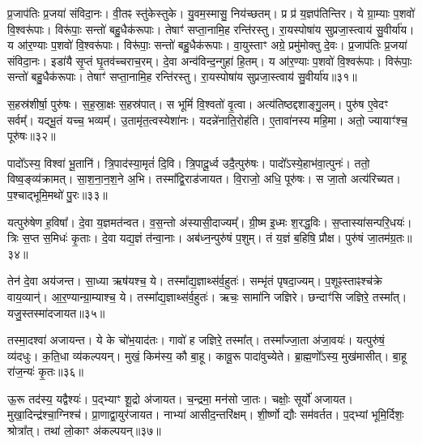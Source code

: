 प्र॒जाप॑तिः प्र॒जया॑ संविदा॒नः। 
वी॒तꣴ स्तु॑केस्तुके। 
यु॒वम॒स्मासु॒ निय॑च्छतम्। 
प्र प्र॑ य॒ज्ञप॑तिन्तिर। 
ये ग्रा॒म्याः प॒शवो॑ वि॒श्वरू॑पाः। 
विरू॑पाः॒ सन्तो॑ बहु॒धैक॑रूपाः। 
तेषाꣳ॑ सप्ता॒नामि॒ह रन्ति॑रस्तु। 
रा॒यस्पोषा॑य सुप्रजा॒स्त्वाय॑ सु॒वीर्या॑य। 
य आ॑र॒ण्याः प॒शवो॑ वि॒श्वरू॑पाः। 
विरू॑पाः॒ सन्तो॑ बहु॒धैक॑रूपाः। 
वा॒युस्ताꣳ अग्रे॒ प्रमु॑मोक्तु दे॒वः। 
प्र॒जाप॑तिः प्र॒जया॑ संविदा॒नः। 
इडा॑यै सृ॒प्तं घृ॒तव॑च्चराच॒रम्। 
दे॒वा अन्व॑विन्द॒न्गुहा॑ हि॒तम्। 
य आ॑र॒ण्याः प॒शवो॑ वि॒श्वरू॑पाः। 
विरू॑पाः॒ सन्तो॑ बहु॒धैक॑रूपाः। 
तेषाꣳ॑ सप्ता॒नामि॒ह रन्ति॑रस्तु। 
रा॒यस्पोषा॑य सुप्रजा॒स्त्वाय॑ सु॒वीर्या॑य॥३१॥
\anuvakamend[आ॒त्मा जना॑नां  विकु॒र्वन्तं॑  विप॒श्चिं प्र॒जानां᳚ वसु॒धानीं᳚  वि॒राजं॒ चर॑न्तं॒  गोम॑तीं मे॒ निय॑च्छ॒त्वेक॑चक्रं॒ व्यो॑मन्मा॒यया॑ दे॒व एक॑रूपा अ॒ष्टौ च॑]

स॒हस्र॑शीर्\mbox{}षा॒ पुरु॑षः। 
स॒ह॒स्रा॒क्षः स॒हस्र॑पात्। 
स भूमिं॑ वि॒श्वतो॑ वृ॒त्वा। 
अत्य॑तिष्ठद्दशाङ्गु॒लम्। 
पुरु॑ष ए॒वेदꣳ सर्वम्᳚। 
यद्भू॒तं यच्च॒ भव्यम्᳚। 
उ॒तामृ॑त॒त्वस्येशा॑नः। 
यदन्ने॑नाति॒रोह॑ति। 
ए॒तावा॑नस्य महि॒मा। 
अतो॒ ज्यायाꣳ॑श्च॒ पूरु॑षः॥३२॥

पादो᳚ऽस्य॒ विश्वा॑ भू॒तानि॑। 
त्रि॒पाद॑स्या॒मृतं॑ दि॒वि। 
त्रि॒पादू॒र्ध्व उदै॒त्पुरु॑षः। 
पादो᳚ऽस्ये॒हाभ॑वा॒त्पुनः॑। 
ततो॒ विष्व॒ङ्व्य॑क्रामत्। 
सा॒श॒ना॒न॒श॒ने अ॒भि। 
तस्मा᳚द्वि॒राड॑जायत। 
वि॒राजो॒ अधि॒ पूरु॑षः। 
स जा॒तो अत्य॑रिच्यत। 
प॒श्चाद्भूमि॒मथो॑ पु॒रः॥३३॥

यत्पुरु॑षेण ह॒विषा᳚। 
दे॒वा य॒ज्ञमत॑न्वत। 
व॒स॒न्तो अ॑स्यासी॒दाज्यम्᳚। 
ग्री॒ष्म इ॒ध्मः  श॒रद्ध॒विः। 
स॒प्तास्या॑सन्परि॒\-धयः॑। 
त्रिः स॒प्त स॒मिधः॑ कृ॒ताः। 
दे॒वा यद्य॒ज्ञं त॑न्वा॒नाः। 
अब॑ध्न॒न्पुरु॑षं प॒शुम्। 
तं य॒ज्ञं ब॒\ar{}हिषि॒ प्रौक्ष\sn{}। 
पुरु॑षं जा॒तम॑ग्र॒तः॥३४॥

तेन॑ दे॒वा अय॑जन्त। 
सा॒ध्या ऋष॑यश्च॒ ये। 
तस्मा᳚द्य॒ज्ञाथ्स॑र्व॒हुतः॑। 
सम्भृ॑तं पृषदा॒ज्यम्। 
प॒शूꣴस्ताꣴश्च॑क्रे वाय॒व्यान्॑। 
आ॒र॒ण्यान्ग्रा॒म्याश्च॒ ये। 
तस्मा᳚द्य॒ज्ञाथ्स॑र्व॒हुतः॑। 
ऋचः॒ सामा॑नि जज्ञिरे। 
छन्दाꣳ॑सि जज्ञिरे॒ तस्मा᳚त्। 
यजु॒स्तस्मा॑दजायत॥३५॥

तस्मा॒दश्वा॑ अजायन्त। 
ये के चो॑भ॒याद॑तः। 
गावो॑ ह जज्ञिरे॒ तस्मा᳚त्। 
तस्मा᳚ज्जा॒ता अ॑जा॒वयः॑। 
यत्पुरु॑षं॒ व्य॑दधुः। 
क॒ति॒धा व्य॑कल्पयन्। 
मुखं॒ किम॑स्य॒ कौ बा॒हू। 
कावू॒रू पादा॑वुच्येते। 
ब्रा॒ह्म॒णो᳚ऽस्य॒ मुख॑मासीत्। 
बा॒हू रा॑ज॒न्यः॑ कृ॒तः॥३६॥

ऊ॒रू तद॑स्य॒ यद्वैश्यः॑। 
प॒द्भ्याꣳ शू॒द्रो अ॑जायत। 
च॒न्द्रमा॒ मन॑सो जा॒तः। 
चक्षोः॒ सूर्यो॑ अजायत। 
मुखा॒दिन्द्र॑श्चा॒ग्निश्च॑। 
प्रा॒णाद्वा॒युर॑जायत। 
नाभ्या॑ आसीद॒न्तरि॑क्षम्। 
शी॒र्ष्णो द्यौः सम॑वर्तत। 
प॒द्भ्यां भूमि॒र्दिशः॒ श्रोत्रा᳚त्। 
तथा॑ लो॒काꣳ अ॑कल्पयन्॥३७॥

